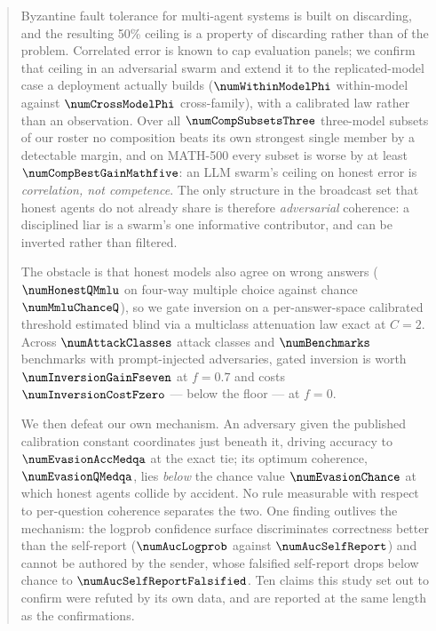 \begin{abstract}
Byzantine fault tolerance for multi-agent systems is built on discarding, and the
resulting 50\% ceiling is a property of discarding rather than of the problem.
Correlated error is known to cap
evaluation panels; we confirm that ceiling in an adversarial swarm and extend it
to the replicated-model case a deployment actually builds
($\numWithinModelPhi$ within-model against $\numCrossModelPhi$ cross-family),
with a calibrated law rather than an observation. Over all
$\numCompSubsetsThree$ three-model subsets of our roster no composition beats
its own strongest single member by a detectable margin, and on MATH-500 every
subset is worse by at least $\numCompBestGainMathfive$: an LLM swarm's ceiling on
honest error is \emph{correlation, not competence}. The only structure in the
broadcast set that honest agents do not already share is therefore
\emph{adversarial} coherence: a disciplined liar is a swarm's one informative
contributor, and can be inverted rather than filtered.

The obstacle is that honest models also agree on wrong answers
($\numHonestQMmlu$ on four-way multiple choice against chance
$\numMmluChanceQ$), so we gate inversion on a per-answer-space calibrated
threshold estimated blind via a multiclass attenuation law exact at $C=2$. Across
$\numAttackClasses$ attack classes and $\numBenchmarks$ benchmarks with
prompt-injected adversaries, gated inversion is worth $\numInversionGainFseven$
at $f=0.7$ and costs $\numInversionCostFzero$ --- below the floor --- at $f=0$.

We then defeat our own mechanism. An adversary given the published calibration
constant coordinates just beneath it, driving accuracy to $\numEvasionAccMedqa$
at the exact tie; its optimum coherence, $\numEvasionQMedqa$, lies \emph{below}
the chance value $\numEvasionChance$ at which honest agents collide by accident.
No rule measurable with respect to per-question coherence separates the two. One
finding outlives the mechanism: the logprob confidence surface discriminates
correctness better than the self-report ($\numAucLogprob$ against
$\numAucSelfReport$) and cannot be authored by the sender, whose falsified
self-report drops below chance to $\numAucSelfReportFalsified$. Ten claims this
study set out to confirm were refuted by its own data, and are reported at the
same length as the confirmations.
\end{abstract}
